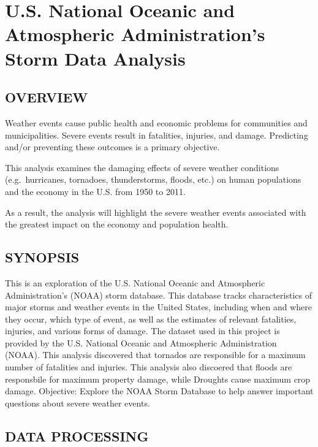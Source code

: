 \documentclass[
]{article}
\author{}
\date{\vspace{-2.5em}}
\begin{document}
\hypertarget{u.s.-national-oceanic-and-atmospheric-administrations-storm-data-analysis}{%
\section{U.S. National Oceanic and Atmospheric Administration's Storm
Data
Analysis}\label{u.s.-national-oceanic-and-atmospheric-administrations-storm-data-analysis}}

\hypertarget{overview}{%
\subsection{OVERVIEW}\label{overview}}

Weather events cause public health and economic problems for communities
and municipalities. Severe events result in fatalities, injuries, and
damage. Predicting and/or preventing these outcomes is a primary
objective.

This analysis examines the damaging effects of severe weather conditions
(e.g.~hurricanes, tornadoes, thunderstorms, floods, etc.) on human
populations and the economy in the U.S. from 1950 to 2011.

As a result, the analysis will highlight the severe weather events
associated with the greatest impact on the economy and population
health.

\hypertarget{synopsis}{%
\subsection{SYNOPSIS}\label{synopsis}}

This is an exploration of the U.S. National Oceanic and Atmospheric
Administration's (NOAA) storm database. This database tracks
characteristics of major storms and weather events in the United States,
including when and where they occur, which type of event, as well as the
estimates of relevant fatalities, injuries, and various forms of damage.
The dataset used in this project is provided by the U.S. National
Oceanic and Atmospheric Administration (NOAA). This analysis discovered
that tornados are responsible for a maximum number of fatalities and
injuries. This analysis also discoered that floods are responsbile for
maximum property damage, while Droughts cause maximum crop damage.
Objective: Explore the NOAA Storm Database to help answer important
questions about severe weather events.

\hypertarget{data-processing}{%
\subsection{DATA PROCESSING}\label{data-processing}}
\end{document}
